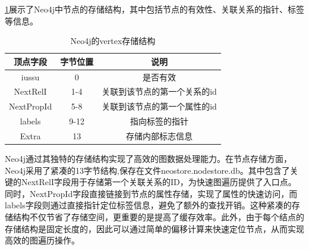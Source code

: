 \cref{tab:neo4j-vertex}展示了Neo4j中节点的存储结构，其中包括节点的有效性、关联关系的指针、标签等信息。\begin{table}[H]
	\centering
	\caption{Neo4j的vertex存储结构}
	\begin{tabular}{|c|c|c|}
		\hline
		顶点字段       & 字节位置 & 说明              \\
		\hline
		iussu      & 0    & 是否有效            \\
		NextRelI   & 1-4  & 关联到该节点的第一个关系的id \\
		NextPropId & 5-8  & 关联到该节点的第一个属性的id \\
		labels     & 9-12 & 指向标签的指针         \\
		Extra      & 13   & 存储内部标志信息        \\
		\hline
	\end{tabular}
	\label{tab:neo4j-vertex}
\end{table}
Neo4j通过其独特的存储结构实现了高效的图数据处理能力。在节点存储方面，Neo4j采用了紧凑的13字节结构,保存在文件neostore.nodestore.db。其中包含了关键的NextRelI字段用于存储第一个关联关系的ID，为快速图遍历提供了入口点。同时，NextPropId字段直接链接到节点的属性存储，实现了属性的快速访问，而labels字段则通过直接指针定位标签信息，避免了额外的查找开销。这种紧凑的存储结构不仅节省了存储空间，更重要的是提高了缓存效率。此外，由于每个结点的存储结构是固定长度的，因此可以通过简单的偏移计算来快速定位节点，从而实现高效的图遍历操作。

